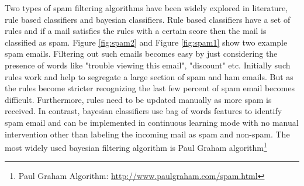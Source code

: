 \documentclass[fleqn]{MJDArticle}
\begin{document}
Two types of spam filtering algorithms have been widely explored in literature, rule based classifiers and bayesian classifiers. Rule based classifiers have a set of rules and if a mail satisfies the rules with a certain score then the mail is classified as spam. Figure \ref{fig:spam2} and Figure \ref{fig:spam1} show two example spam emails.  Filtering out such emails becomes easy by just considering the presence of words like "trouble viewing this email", "discount" etc. Initially such rules work and help to segregate a large section of spam and ham emails. But as the rules become stricter recognizing the last few percent of spam email becomes difficult. Furthermore, rules need to be updated manually as  more spam is received. In contrast, bayesian classifiers use bag of words features to identify spam email and can be implemented in continuous learning mode with no manual intervention other than labeling the incoming mail as spam and non-spam. The most widely used bayesian filtering algorithm is Paul Graham algorithm\footnote{Paul Graham Algorithm: \href{http://www.paulgraham.com/spam.html}{http://www.paulgraham.com/spam.html}}
\end{document}
